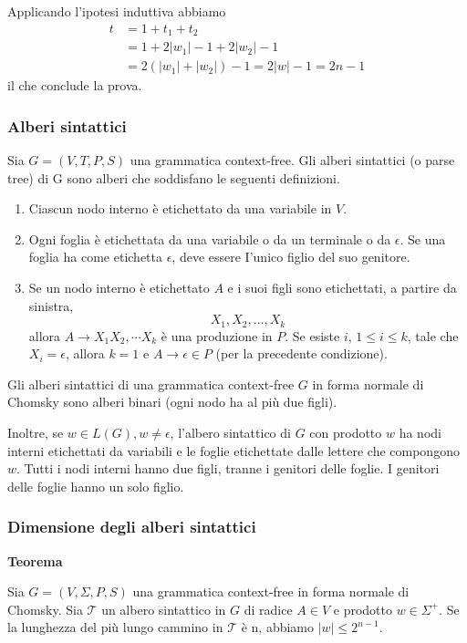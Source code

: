 Applicando l'ipotesi induttiva abbiamo
$$
\begin{aligned}
t &=1+t_{1}+t_{2} \\
&=1+2\left|w_{1}\right|-1+2\left|w_{2}\right|-1 \\
&=2\left(\left|w_{1}\right|+\left|w_{2}\right|\right)-1=2|w|-1=2 n-1
\end{aligned}
$$
il che conclude la prova.

\subsubsection{Alberi sintattici}

Sia $G=(V, T, P, S)$ una grammatica context-free. Gli alberi sintattici (o parse tree) di G sono alberi che soddisfano le seguenti definizioni.
\begin{enumerate}
    \item Ciascun nodo interno è etichettato da una variabile in $V$.
    \item Ogni foglia è etichettata da una variabile o da un terminale o da $\epsilon$. Se una foglia ha come etichetta $\epsilon$, deve essere I'unico figlio del suo genitore.
    \item Se un nodo interno è etichettato $A$ e i suoi figli sono etichettati, a partire da sinistra,
$$
X_{1}, X_{2}, \ldots, X_{k}
$$
allora $A \rightarrow X_{1} X_{2}, \cdots X_{k}$ è una produzione in $P$. Se esiste $i$, $1 \leq i \leq k$, tale che $X_{i}=\epsilon$, allora $k=1$ e $A \rightarrow \epsilon \in P$ (per la precedente condizione).
\end{enumerate}

Gli alberi sintattici di una grammatica context-free $G$ in forma normale di Chomsky sono alberi binari (ogni nodo ha al più due figli).

Inoltre, se $w \in L(G), w \neq \epsilon$, l'albero sintattico di $G$ con prodotto $w$ ha nodi interni etichettati da variabili e le foglie etichettate dalle lettere che compongono $w$. Tutti i nodi interni hanno due figli, tranne i genitori delle foglie. I genitori delle foglie hanno un solo figlio.

\subsubsection{Dimensione degli alberi sintattici}

\textbf{Teorema}

Sia $G=(V, \Sigma, P, S)$ una grammatica context-free in forma normale di Chomsky. Sia $\mathcal{T}$ un albero sintattico in $G$ di radice $A \in V$ e prodotto $w \in \Sigma^{+} .$ Se la lunghezza del più lungo cammino in $\mathcal{T}$ è n, abbiamo $|w| \leq 2^{n-1}$.

